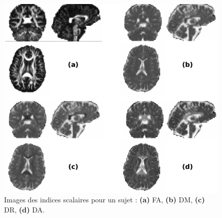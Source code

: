 \begin{figure}[ht]
    \centering
    \includegraphics[width=1\textwidth]{Images/scalaires.pdf}
    \caption{\label{fig:scalaires}Images des indices scalaires pour un sujet : \textbf{(a)} FA, \textbf{(b)} DM, \textbf{(c)} DR, \textbf{(d)} DA.}
\end{figure}

